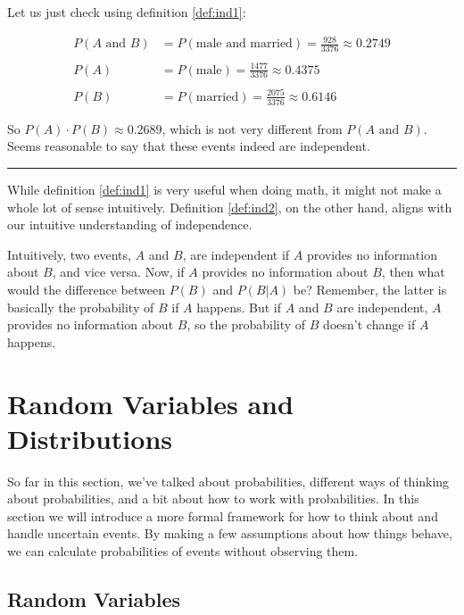 \documentclass[]{book}
\theoremstyle{definition}
\theoremstyle{definition}
\theoremstyle{definition}
\theoremstyle{remark}
\begin{document}
Let us just check using definition \ref{def:ind1}:

\begin{align*}
  P(A \text{ and } B) &= P(\text{male and married}) = \frac{928}{3376} \approx 0.2749 \\
  & \\
  P(A) &= P(\text{male}) = \frac{1477}{3376} \approx 0.4375 \\
  & \\
  P(B) &= P(\text{married}) = \frac{2075}{3376} \approx 0.6146
\end{align*}

So \(P(A)\cdot P(B) \approx 0.2689\), which is not very different from \(P(A \text{ and } B)\). Seems reasonable to say that these events indeed are independent.

\begin{center}\rule{0.5\linewidth}{\linethickness}\end{center}

While definition \ref{def:ind1} is very useful when doing math, it might not make a whole lot of sense intuitively. Definition \ref{def:ind2}, on the other hand, aligns with our intuitive understanding of independence.

Intuitively, two events, \(A\) and \(B\), are independent if \(A\) provides no information about \(B\), and vice versa. Now, if \(A\) provides no information about \(B\), then what would the difference between \(P(B)\) and \(P(B|A)\) be? Remember, the latter is basically the probability of \(B\) if \(A\) happens. But if \(A\) and \(B\) are independent, \(A\) provides no information about \(B\), so the probability of \(B\) doesn't change if \(A\) happens.

\hypertarget{random-variables-and-distributions}{%
\chapter{Random Variables and Distributions}\label{random-variables-and-distributions}}

So far in this section, we've talked about probabilities, different ways of thinking about probabilities, and a bit about how to work with probabilities. In this section we will introduce a more formal framework for how to think about and handle uncertain events. By making a few assumptions about how things behave, we can calculate probabilities of events without observing them.

\hypertarget{random-variables}{%
\section{Random Variables}\label{random-variables}}
\end{document}
